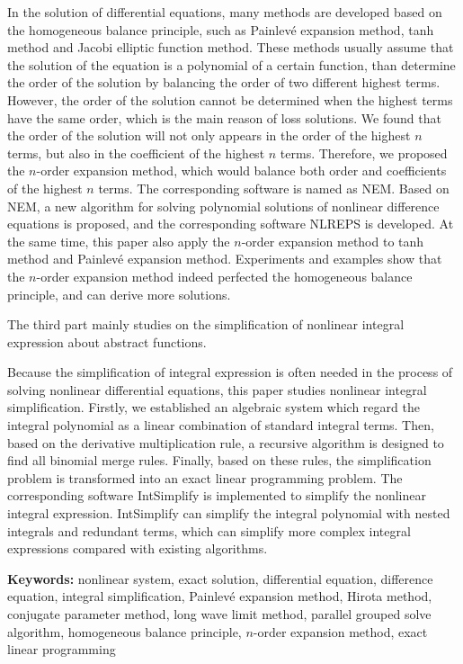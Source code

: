 In the solution of differential equations, many methods are developed based on the  homogeneous balance principle, such as Painlevé expansion method, tanh method and Jacobi elliptic function method. These methods usually assume that the solution of the equation is a polynomial of a certain function, than determine the order of the solution by balancing the order of two different highest terms. However, the order of the solution cannot be determined when the highest terms have the same order, which is the main reason of loss solutions. We found that the order of the solution will not only appears in the order of the highest $n$ terms, but also in the coefficient of the highest $n$ terms. Therefore, we proposed the $n$-order expansion method, which would balance both order and coefficients of the highest $n$ terms. The corresponding software is named as NEM.  Based on NEM, a new algorithm for solving polynomial solutions of  nonlinear difference equations is proposed, and the corresponding software NLREPS is developed. At the same time, this paper also apply the $n$-order expansion method to tanh method and Painlevé expansion method. Experiments and examples show that the $n$-order expansion method indeed perfected the homogeneous balance principle, and can derive more solutions.

The third part mainly studies on the simplification of nonlinear integral expression about abstract functions.

Because the simplification of integral expression is often needed in the process of solving nonlinear differential equations, this paper studies nonlinear integral simplification. Firstly, we established an algebraic system which  regard the integral polynomial as a linear combination of standard integral terms. Then, based on the derivative multiplication rule, a recursive algorithm is designed to find all binomial merge rules. Finally, based on these rules, the simplification problem is transformed into an exact linear programming problem. The corresponding software  IntSimplify is implemented to simplify the nonlinear integral expression. IntSimplify can simplify the integral polynomial with nested integrals and redundant terms, which can simplify more complex integral expressions compared with existing algorithms.

\bigskip
\noindent\textbf{ Keywords:}
nonlinear system, exact solution, differential equation, difference equation, integral simplification, Painlevé expansion method, Hirota method, conjugate parameter method, long wave limit method, parallel grouped solve algorithm, homogeneous balance principle, $n$-order expansion method, exact linear programming
